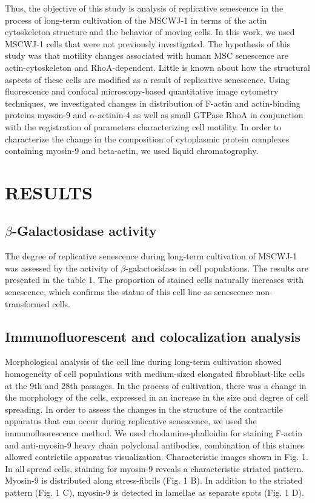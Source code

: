 \documentclass[alpha-refs]{wiley-article}
\begin{document}
Thus, the objective of this study is analysis of replicative senescence in the process of long-term cultivation of the MSCWJ-1 in terms of the actin cytoskeleton structure and the behavior of moving cells.
In this work, we used MSCWJ-1 cells that were not previously investigated.
The hypothesis of this study was that motility changes associated with human MSC senescence are actin-cytoskeleton and RhoA-dependent.
Little is known about how the structural aspects of these cells are modified as a result of replicative senescence.
Using fluorescence and confocal microscopy-based quantitative image cytometry techniques, we investigated changes in distribution of F-actin and actin-binding proteins myosin-9 and $\alpha$-actinin-4 as well as small GTPase RhoA in conjunction with the registration of parameters characterizing cell motility.
In order to characterize the change in the composition of cytoplasmic protein complexes containing myosin-9 and beta-actin, we used liquid chromatography.


\section{RESULTS}

\subsection{$\beta$-Galactosidase activity}

The degree of replicative senescence during long-term cultivation of MSCWJ-1 was assessed by the activity of $\beta$-galactosidase in cell populations.
The results are presented in the table 1.
The proportion of stained cells naturally increases with senescence, which confirms the status of this cell line as senescence non-transformed cells.

\subsection{Immunofluorescent and colocalization analysis}

Morphological analysis of the cell line during long-term cultivation showed homogeneity of cell populations with medium-sized elongated fibroblast-like cells at the 9th and 28th passages.
In the process of cultivation, there was a change in the morphology of the cells, expressed in an increase in the size and degree of cell spreading.
In order to assess the changes in the structure of the contractile apparatus that can occur during replicative senescence, we used the immunofluorescence method.
We used rhodamine-phalloidin for staining F-actin and anti-myosin-9 heavy chain polyclonal antibodies, combination of this staines allowed contrictile apparatus visualization.
Characteristic images shown in Fig. 1.
In all spread cells, staining for myosin-9 reveals a characteristic striated pattern.
Myosin-9 is distributed along stress-fibrils (Fig. 1 B).
In addition to the striated pattern (Fig. 1 C), myosin-9 is detected in lamellae as separate spots (Fig. 1 D).
\end{document}
